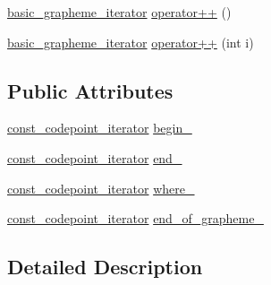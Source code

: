 {\bf }\par
\begin{DoxyCompactItemize}
\item 
\hyperlink{classu5e_1_1basic__grapheme__iterator}{basic\+\_\+grapheme\+\_\+iterator} \hyperlink{classu5e_1_1basic__grapheme__iterator_af96840578fa52158af0687c4262f6592}{operator++} ()
\item 
\hyperlink{classu5e_1_1basic__grapheme__iterator}{basic\+\_\+grapheme\+\_\+iterator} \hyperlink{classu5e_1_1basic__grapheme__iterator_a8281628c1251387fc1810aef710de5be}{operator++} (int i)
\end{DoxyCompactItemize}

\subsection*{Public Attributes}
{\bf }\par
\begin{DoxyCompactItemize}
\item 
\hyperlink{classu5e_1_1basic__grapheme__iterator_a3fd90c1a24fccf790b94199950339846}{const\+\_\+codepoint\+\_\+iterator} \hyperlink{classu5e_1_1basic__grapheme__iterator_a38321d25691f11f4292dc2a1641f0ddb}{begin\+\_\+}
\item 
\hyperlink{classu5e_1_1basic__grapheme__iterator_a3fd90c1a24fccf790b94199950339846}{const\+\_\+codepoint\+\_\+iterator} \hyperlink{classu5e_1_1basic__grapheme__iterator_a717e587924ade6d966be95bfe57487a3}{end\+\_\+}
\end{DoxyCompactItemize}

{\bf }\par
\begin{DoxyCompactItemize}
\item 
\hyperlink{classu5e_1_1basic__grapheme__iterator_a3fd90c1a24fccf790b94199950339846}{const\+\_\+codepoint\+\_\+iterator} \hyperlink{classu5e_1_1basic__grapheme__iterator_ad83406ade7728eeb7ad5b8344c44156f}{where\+\_\+}
\item 
\hyperlink{classu5e_1_1basic__grapheme__iterator_a3fd90c1a24fccf790b94199950339846}{const\+\_\+codepoint\+\_\+iterator} \hyperlink{classu5e_1_1basic__grapheme__iterator_a74489f73ba6c645254bf28a6e2c42946}{end\+\_\+of\+\_\+grapheme\+\_\+}
\end{DoxyCompactItemize}



\subsection{Detailed Description}
